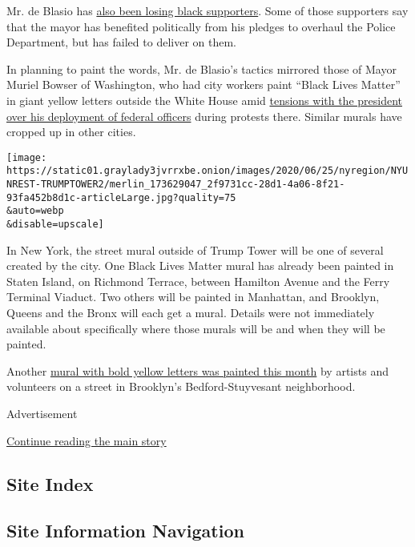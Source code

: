 Mr. de Blasio has
\href{https://www.nytimes3xbfgragh.onion/2020/06/12/nyregion/de-blasio-blacks-protest.html}{also
been losing black supporters}. Some of those supporters say that the
mayor has benefited politically from his pledges to overhaul the Police
Department, but has failed to deliver on them.

In planning to paint the words, Mr. de Blasio's tactics mirrored those
of Mayor Muriel Bowser of Washington, who had city workers paint ``Black
Lives Matter'' in giant yellow letters outside the White House amid
\href{https://www.nytimes3xbfgragh.onion/2020/06/04/upshot/george-floyd-protests-dc-statehood.html}{tensions
with the president over his deployment of federal officers} during
protests there. Similar murals have cropped up in other cities.

\texttt{[image: https://static01.graylady3jvrrxbe.onion/images/2020/06/25/nyregion/NYUNREST-TRUMPTOWER2/merlin\_173629047\_2f9731cc-28d1-4a06-8f21-93fa452b8d1c-articleLarge.jpg?quality=75\\\&auto=webp\\\&disable=upscale]}

In New York, the street mural outside of Trump Tower will be one of
several created by the city. One Black Lives Matter mural has already
been painted in Staten Island, on Richmond Terrace, between Hamilton
Avenue and the Ferry Terminal Viaduct. Two others will be painted in
Manhattan, and Brooklyn, Queens and the Bronx will each get a mural.
Details were not immediately available about specifically where those
murals will be and when they will be painted.

Another
\href{https://www.cbsnews.com/news/black-lives-matter-mural-new-york-city-brooklyn/}{mural
with bold yellow letters was painted this month} by artists and
volunteers on a street in Brooklyn's Bedford-Stuyvesant neighborhood.

Advertisement

\protect\hyperlink{after-bottom}{Continue reading the main story}

\hypertarget{site-index}{%
\subsection{Site Index}\label{site-index}}

\hypertarget{site-information-navigation}{%
\subsection{Site Information
Navigation}\label{site-information-navigation}}

